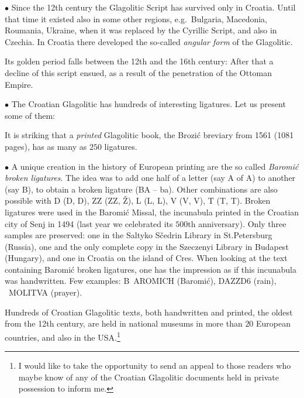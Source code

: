 \medskip

\noindent$\bullet$ Since the 12th century the Glagolitic
Script has survived only in Croatia. Until that time
it existed also in some other regions, e.g.\ Bulgaria,
Macedonia, Roumania,   Ukraine, when it was replaced by
the Cyrillic Script, and also in Czechia. In Croatia there developed the so-called
{\it angular form\/} of the Glagolitic.



\noindent Its  golden period
falls between  the 12th and the 16th century:
After that a
decline of  this script ensued, as a result of
the penetration of the Ottoman Empire.
\medskip


\noindent$\bullet$ The Croatian Glagolitic has hundreds of interesting
ligatures.
 Let us present some of them:




\noindent It is
striking that a {\it printed\/} Glagolitic book, the Brozi\'c breviary from 1561
(1081 pages),  has as many as $250$ ligatures.


\noindent$\bullet$ A unique
creation in the history of European printing are the so called
{\it Baromi\'c broken ligatures\/}. The idea was to add one half of
a letter (say {\lom A} of {\mgl A}) to another (say {\mgl
B}), to obtain a broken ligature (\hbox{{\mgl B}{\lom A}} -- ba). Other
combinations are also possible with
{\lom D} ({\mgl D}, D),
{\lom ZZ} ({\mgl ZZ}, \v Z),
{\lom L} ({\mgl L}, L),
{\lom V} ({\mgl V}, V),
{\lom T} ({\mgl T}, T).
Broken ligatures were used in the Baromi\'c Missal, the
incunabula printed in the Croatian city of Senj in 1494
(last year we celebrated its $500$th
anniversary). Only three samples are preserved: one in
the Saltyko S\v cedrin Library in St.Petersburg (Russia),
one and the only complete copy in
the Szeczenyi Library in Budapest (Hungary), and one
in Croatia on the island of Cres. When looking at the text
containing Baromi\'c broken ligatures,  one has the impression as if this
incunabula was handwritten. Few examples: \hbox{{\mgl B}{\lom
A}{\mgl ROMICH}} (Baromi\'c), \hbox{{\mgl D}{\lom AZZD6}} (rain), \hbox{\mgl
MO{\lom L}{\mgl I}{\lom TVA}} (prayer).


Hundreds of Croatian Glagolitic texts, both handwritten and
printed, the oldest from the 12th century,
 are held in national museums in more than $20$ European
countries, and also in the USA.\footnote{I would like to
take the opportunity to send an appeal to those readers who maybe
know of any of the Croatian Glagolitic documents
held in private possession to inform me.}

